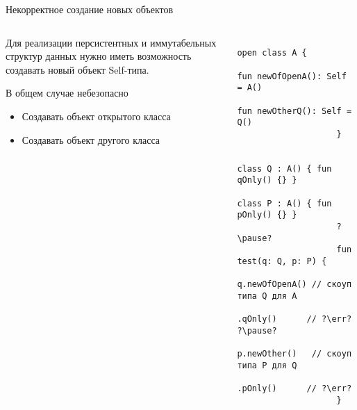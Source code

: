\documentclass[handout,aspectratio=169,usenames,dvipsnames]{beamer}
\newcommand{\err}[0]{\textcolor{red}{ошибка}}
\begin{document}
    \begin{frame}[fragile]{Некорректное создание новых объектов}
        \begin{columns}[onlytextwidth]
            \begin{column}[t]{0.46\textwidth}
                \vspace{0.5em}

                Для реализации персистентных и иммутабельных структур данных нужно иметь возможность создавать новый объект Self-типа.

                \vspace{1em}
                \begin{block}{В общем случае небезопасно}
                    \begin{itemize}
                        \item Создавать объект открытого класса
                        \item Создавать объект другого класса
                    \end{itemize}
                \end{block}
            \end{column}\hfill%
            \begin{column}[t]{0.50\textwidth}
                \pause
                \begin{verbatim}
                    open class A {
                        fun newOfOpenA(): Self = A()
                        fun newOtherQ(): Self = Q()
                    }

                    class Q : A() { fun qOnly() {} }
                    class P : A() { fun pOnly() {} }
                    ?\pause?
                    fun test(q: Q, p: P) {
                        q.newOfOpenA() // скоуп типа Q для A
                         .qOnly()      // ?\err? ?\pause?
                        p.newOther()   // скоуп типа P для Q
                         .pOnly()      // ?\err?
                    }
                \end{verbatim}
            \end{column}
        \end{columns}
    \end{frame}
\end{document}
